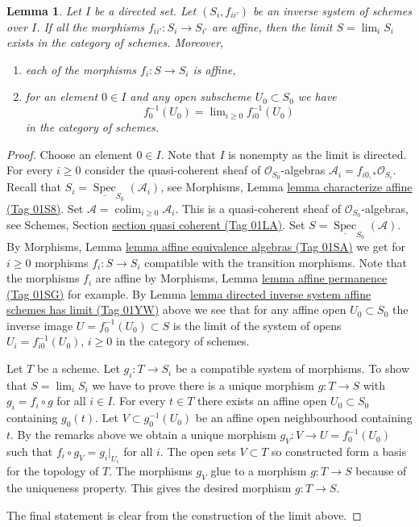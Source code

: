 \documentclass{amsart}
\theoremstyle{plain}
\newtheorem{lemma}[subsection]{Lemma}
\theoremstyle{definition}
\theoremstyle{remark}
\numberwithin{equation}{subsection}
\def\lim{\mathop{\mathrm{lim}}\nolimits}
\def\colim{\mathop{\mathrm{colim}}\nolimits}
\def\Spec{\mathop{\mathrm{Spec}}}
\begin{document}
\begin{lemma}
\label{limits-lemma-directed-inverse-system-has-limit}
Let $I$ be a directed set. Let $(S_i, f_{ii'})$ be an
inverse system of schemes over $I$. If all the morphisms
$f_{ii'} : S_i \to S_{i'}$ are affine, then the limit $S = \lim_i S_i$ exists
in the category of schemes. Moreover,
\begin{enumerate}
\item each of the morphisms $f_i : S \to S_i$ is affine,
\item for an element $0 \in I$ and any open subscheme $U_0 \subset S_0$
we have
$$
f_0^{-1}(U_0) = \lim_{i \geq 0} f_{i0}^{-1}(U_0)
$$
in the category of schemes.
\end{enumerate}
\end{lemma}

\begin{proof}
Choose an element $0 \in I$. Note that $I$ is nonempty as the limit is
directed. For every $i \geq 0$ consider the quasi-coherent sheaf of
$\mathcal{O}_{S_0}$-algebras $\mathcal{A}_i = f_{i0, *}\mathcal{O}_{S_i}$.
Recall that $S_i = \underline{\Spec}_{S_0}(\mathcal{A}_i)$,
see Morphisms, Lemma \href{https://stacks.math.columbia.edu/tag/01S8}{lemma characterize affine (Tag 01S8)}.
Set $\mathcal{A} = \colim_{i \geq 0} \mathcal{A}_i$.
This is a quasi-coherent sheaf of $\mathcal{O}_{S_0}$-algebras,
see Schemes, Section \href{https://stacks.math.columbia.edu/tag/01LA}{section quasi coherent (Tag 01LA)}.
Set $S = \underline{\Spec}_{S_0}(\mathcal{A})$.
By Morphisms, Lemma \href{https://stacks.math.columbia.edu/tag/01SA}{lemma affine equivalence algebras (Tag 01SA)}
we get for $i \geq 0$ morphisms $f_i : S \to S_i$ compatible with
the transition morphisms. Note that the morphisms $f_i$ are
affine by Morphisms, Lemma \href{https://stacks.math.columbia.edu/tag/01SG}{lemma affine permanence (Tag 01SG)} for example.
By Lemma \href{https://stacks.math.columbia.edu/tag/01YW}{lemma directed inverse system affine schemes has limit (Tag 01YW)} above
we see that for any affine open $U_0 \subset S_0$ the
inverse image $U = f_0^{-1}(U_0) \subset S$ is the limit of the
system of opens $U_i = f_{i0}^{-1}(U_0)$, $i \geq 0$ in the
category of schemes.

\medskip\noindent
Let $T$ be a scheme. Let $g_i : T \to S_i$ be a compatible system
of morphisms. To show that $S = \lim_i S_i$ we have
to prove there is a unique morphism $g : T \to S$ with
$g_i = f_i \circ g$ for all $i \in I$.
For every $t \in T$ there exists an affine open
$U_0 \subset S_0$ containing $g_0(t)$. Let $V \subset g_0^{-1}(U_0)$
be an affine open neighbourhood containing $t$.
By the remarks above we obtain a unique morphism
$g_V : V \to U = f_0^{-1}(U_0)$ such that $f_i \circ g_V = g_i|_{U_i}$
for all $i$. The open sets $V \subset T$ so constructed form
a basis for the topology of $T$. The morphisms $g_V$ glue to a morphism
$g : T \to S$ because of the uniqueness property. This gives the
desired morphism $g : T \to S$.

\medskip\noindent
The final statement is clear from the construction of the limit above.
\end{proof}
\end{document}
